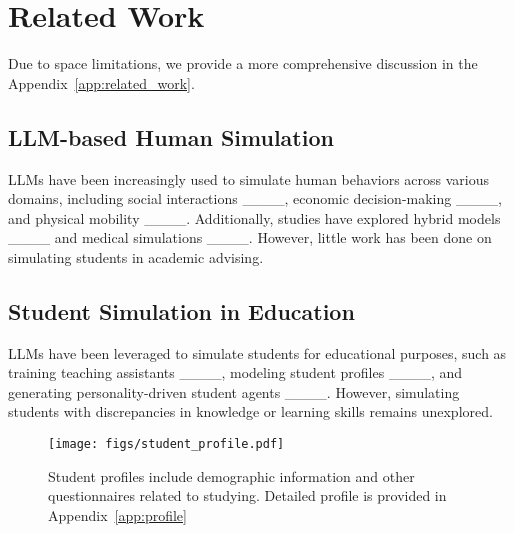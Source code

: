 \section{Related Work}
Due to space limitations, we provide a more comprehensive discussion in the Appendix~\ref{app:related_work}.

\subsection{LLM-based Human Simulation}
LLMs have been increasingly used to simulate human behaviors across various domains, including social interactions ____, economic decision-making ____, and physical mobility ____. Additionally, studies have explored hybrid models ____ and medical simulations ____. However, little work has been done on simulating students in academic advising.

\subsection{Student Simulation in Education}
LLMs have been leveraged to simulate students for educational purposes, such as training teaching assistants ____, modeling student profiles ____, and generating personality-driven student agents ____. However, simulating students with discrepancies in knowledge or learning skills remains unexplored.



\begin{figure}[t]
  \texttt{[image: figs/student\_profile.pdf]}
  \caption{Student profiles include demographic information and other questionnaires related to studying. Detailed profile is provided in Appendix~\ref{app:profile}}
  \label{fig:student_profile}
  \vspace{-5mm}
\end{figure}